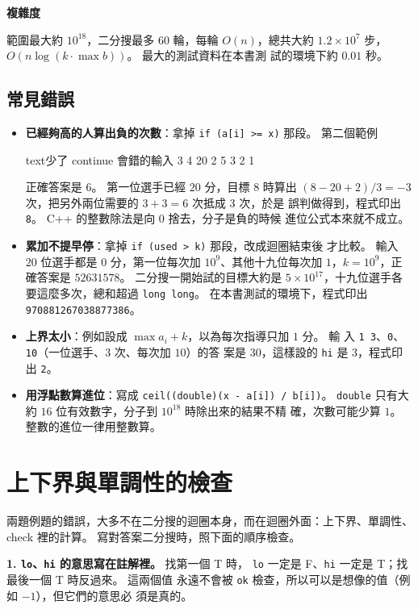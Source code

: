 \textbf{複雜度}

範圍最大約 $10^{18}$，二分搜最多 $60$ 輪，每輪 $O(n)$，總共大約
$1.2 \times 10^7$ 步，$O(n \log (k \cdot \max b))$。 最大的測試資料在本書測
試的環境下約 $0.01$ 秒。

\subsection{常見錯誤}

\begin{itemize}
\item \textbf{已經夠高的人算出負的次數}：拿掉 \texttt{if (a[i] >= x)} 那段。
第二個範例
\begin{code}{text}{少了 continue 會錯的輸入}
3 4
20 2 5
3 2 1
\end{code}
正確答案是 $6$。 第一位選手已經 $20$ 分，目標 $8$ 時算出
$(8 - 20 + 2) / 3 = -3$ 次，把另外兩位需要的 $3 + 3 = 6$ 次抵成 $3$ 次，於是
誤判做得到，程式印出 \texttt{8}。 C++ 的整數除法是向 $0$ 捨去，分子是負的時候
進位公式本來就不成立。
\item \textbf{累加不提早停}：拿掉 \texttt{if (used > k)} 那段，改成迴圈結束後
才比較。 輸入 $20$ 位選手都是 $0$ 分，第一位每次加 $10^9$、其他十九位每次加
$1$，$k = 10^9$，正確答案是 $52631578$。 二分搜一開始試的目標大約是
$5 \times 10^{17}$，十九位選手各要這麼多次，總和超過 \texttt{long long}。
在本書測試的環境下，程式印出 \texttt{970881267038877386}。
\item \textbf{上界太小}：例如設成 $\max a_i + k$，以為每次指導只加 $1$ 分。 輸
入 \texttt{1 3}、\texttt{0}、\texttt{10}（一位選手、$3$ 次、每次加 $10$）的答
案是 $30$，這樣設的 \texttt{hi} 是 $3$，程式印出 \texttt{2}。
\item \textbf{用浮點數算進位}：寫成 \texttt{ceil((double)(x - a[i]) / b[i])}。
\texttt{double} 只有大約 $16$ 位有效數字，分子到 $10^{18}$ 時除出來的結果不精
確，次數可能少算 $1$。 整數的進位一律用整數算。
\end{itemize}

\section{上下界與單調性的檢查}
\label{sec:bs-checklist}

兩題例題的錯誤，大多不在二分搜的迴圈本身，而在迴圈外面：上下界、單調性、
check 裡的計算。 寫對答案二分搜時，照下面的順序檢查。

\textbf{1. \texttt{lo}、\texttt{hi} 的意思寫在註解裡。} 找第一個 T 時，
\texttt{lo} 一定是 F、\texttt{hi} 一定是 T；找最後一個 T 時反過來。 這兩個值
永遠不會被 \texttt{ok} 檢查，所以可以是想像的值（例如 $-1$），但它們的意思必
須是真的。

